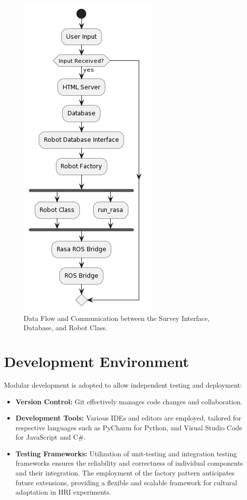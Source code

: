 \begin{figure}
    \begin{center}
        \includegraphics[scale=0.5]{Chapter6/flow.png}  
        \caption{Data Flow and Communication between the Survey Interface, Database, and Robot Class.}
        \label{fig:figure3}
    \end{center}
\end{figure}

\section{Development Environment}

Modular development is adopted to allow independent testing and deployment:

\begin{itemize}
    \item \textbf{Version Control:} Git effectively manages code changes and collaboration.
    \item \textbf{Development Tools:} Various IDEs and editors are employed, tailored for respective languages such as PyCharm for Python, and Visual Studio Code for JavaScript and C\#.
    \item \textbf{Testing Frameworks:} Utilization of unit-testing and integration testing frameworks ensures the reliability and correctness of individual components and their integration. The employment of the factory pattern anticipates future extensions, providing a flexible and scalable framework for cultural adaptation in HRI experiments.
\end{itemize}

